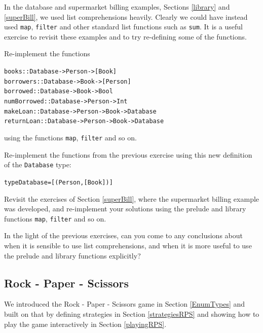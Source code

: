 In the database and supermarket billing examples, Sections \ref{library} and \ref{superBill}, we used list comprehensions heavily. Clearly we could have instead used \texttt{map},  \texttt{filter} and other standard list functions such as \texttt{sum}. It is a useful exercise to revisit these examples and to try re-defining some of the functions. 


\begin{exercises}

\item
Re-implement the functions
\begin{alltt}
books       :: Database -> Person -> [Book]
borrowers   :: Database -> Book -> [Person]
borrowed    :: Database -> Book -> Bool
numBorrowed :: Database -> Person -> Int
makeLoan   :: Database -> Person -> Book -> Database
returnLoan :: Database -> Person -> Book -> Database
\end{alltt}
using the functions \texttt{map},  \texttt{filter} and so on.

\item
Re-implement the functions from the previous exercise using this new definition of the 
\texttt{Database} type:
\begin{alltt}
type Database = [(Person,[Book])]
\end{alltt}

\item
Revisit the exercises of Section \ref{superBill}, where the supermarket billing example was developed, and re-implement your solutions using the prelude and library functions \texttt{map},  \texttt{filter} and so on.

\item
In the light of the previous exercises, can you come to any conclusions about when it is sensible to use list comprehensions, and when it is more useful to use the prelude and library functions explicitly?



\end{exercises}

\subsection*{Rock - Paper - Scissors}

We introduced the Rock - Paper - Scissors game in Section \ref{EnumTypes} and built on that by defining strategies in Section \ref{strategiesRPS} and showing how to play the game interactively in Section \ref{playingRPS}. 


